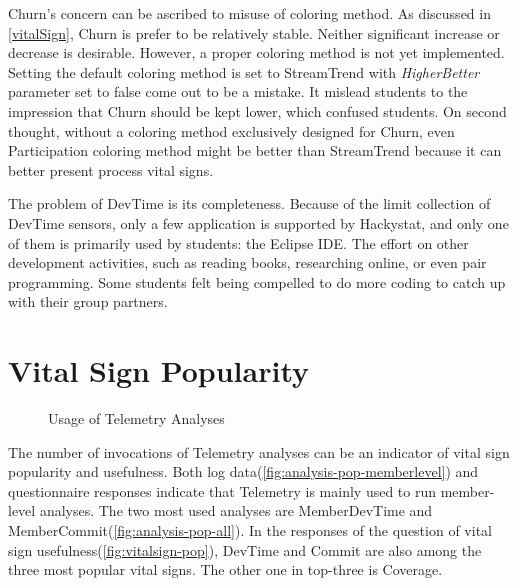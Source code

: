 Churn's concern can be ascribed to misuse of coloring method. As discussed in \autoref{vitalSign}, Churn is prefer to be relatively stable. Neither significant increase or decrease is desirable. However, a proper coloring method is not yet implemented. Setting the default coloring method is set to StreamTrend with {\it HigherBetter} parameter set to false come out to be a mistake. It mislead students to the impression that Churn should be kept lower, which confused students. On second thought, without a coloring method exclusively designed for Churn, even Participation coloring method might be better than StreamTrend because it can better present process vital signs.

The problem of DevTime is its completeness. Because of the limit collection of DevTime sensors, only a few application is supported by Hackystat, and only one of them is primarily used by students: the Eclipse IDE. The effort on other development activities, such as reading books, researching online, or even pair programming. Some students felt being compelled to do more coding to catch up with their group partners.


\section {Vital Sign Popularity}

\begin{figure}[htbp] %
   \centering     
   \vspace{.3in}
   \caption{Usage of Telemetry Analyses}
   \label{fig:analysis-pop}
\end{figure}

The number of invocations of Telemetry analyses can be an indicator of vital sign popularity and usefulness. Both log data(\autoref{fig:analysis-pop-memberlevel}) and questionnaire responses indicate that Telemetry is mainly used to run member-level analyses. The two most used analyses are MemberDevTime and MemberCommit(\autoref{fig:analysis-pop-all}). In the responses of the question of vital sign usefulness(\autoref{fig:vitalsign-pop}), DevTime and Commit are also among the three most popular vital signs. The other one in top-three is Coverage. 

